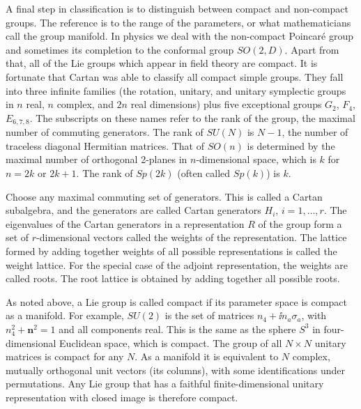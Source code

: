 A final step in classification is to distinguish between compact and
non-compact groups. The reference is to the range of the parameters, or what
mathematicians call the group manifold. In physics we deal with the
non-compact Poincaré group and sometimes its completion to the conformal group
$SO(2,D)$. Apart from that, all of the Lie groups which appear in field theory
are compact. It is fortunate that Cartan was able to classify all compact
simple groups. They fall into three infinite families (the rotation, unitary,
and unitary symplectic groups in $n$ real, $n$ complex, and $2n$ real
dimensions) plus five exceptional groups $G_2$, $F_4$, $E_{6,7,8}$. The
subscripts on these names refer to the rank of the group, the maximal number
of commuting generators. The rank of $SU(N)$ is $N-1$, the number of traceless
diagonal Hermitian matrices. That of $SO(n)$ is determined by the maximal
number of orthogonal 2-planes in $n$-dimensional space, which is $k$ for
$n=2k$ or $2k+1$. The rank of $Sp(2k)$ (often called $Sp(k)$) is $k$.

Choose any maximal commuting set of generators. This is called a Cartan
subalgebra, and the generators are called Cartan generators $H_i$, $i=1,\ldots,r$.
The eigenvalues of the Cartan generators in a representation $R$ of the group
form a set of $r$-dimensional vectors called the weights of the representation.
The lattice formed by adding together weights of all possible representations
is called the weight lattice. For the special case of the adjoint
representation, the weights are called roots. The root lattice is obtained by
adding together all possible roots.

As noted above, a Lie group is called compact if its parameter space is compact
as a manifold. For example, $SU(2)$ is the set of matrices
$n_4+\ii n_a\sigma_a$, with $n_4^2+\boldsymbol n^2=1$ and all components real.
This is the same as the sphere $S^3$ in four-dimensional Euclidean space,
which is compact. The group of all $N\times N$ unitary matrices is compact for
any $N$. As a manifold it is equivalent to $N$ complex, mutually orthogonal
unit vectors (its columns), with some identifications under permutations. Any
Lie group that has a faithful finite-dimensional unitary representation with
closed image is therefore compact.

